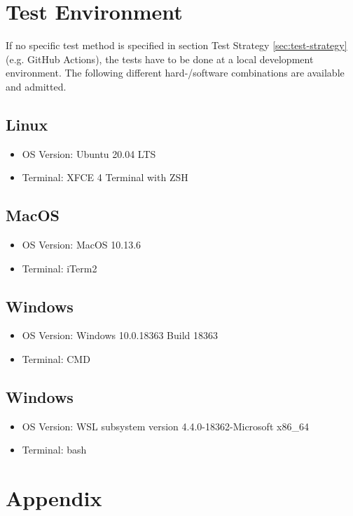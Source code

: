 \documentclass[a4paper]{article}
\begin{document}
\clearpage
\section{Test Environment}
If no specific test method is specified in section Test Strategy \ref{sec:test-strategy} (e.g. GitHub Actions), the tests have to be done at a local development environment. The following different hard-/software combinations are available and admitted.

\subsection{Linux}
\begin{itemize}
    \item OS Version: Ubuntu 20.04 LTS
    \item Terminal: XFCE 4 Terminal with ZSH
\end{itemize}

\subsection{MacOS}
\begin{itemize}
    \item OS Version: MacOS 10.13.6
    \item Terminal: iTerm2
\end{itemize}

\subsection{Windows}
\begin{itemize}
    \item OS Version: Windows 10.0.18363 Build 18363
    \item Terminal: CMD
\end{itemize}

\subsection{Windows}
\begin{itemize}
    \item OS Version: WSL subsystem version 4.4.0-18362-Microsoft x86\_64
    \item Terminal: bash
\end{itemize}


\clearpage
\section{Appendix}
\end{document}
